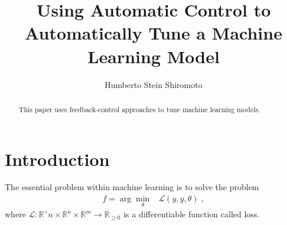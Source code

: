 \documentclass{tufte-handout}
\title{Using Automatic Control to Automatically Tune a Machine Learning Model}
\author[H. Stein Shiromoto]{Humberto Stein Shiromoto}
\begin{document}
\maketitle%

\begin{abstract}
\noindent
This paper uses feedback-control approaches to tune machine learning models.
\end{abstract}


\section{Introduction}

The essential problem within machine learning is to solve the problem
\begin{eqnarray}
  f=\arg\min_\theta&\mathcal{L}(y,\hat{y},\theta)\;,
\end{eqnarray}
where $\mathcal{L}:\mathbb{R}ˆn\times\mathbb{R}^n\times\mathbb{R}^m\to\mathbb{R}_{\geq0}$ is a differentiable function called loss.
\end{document}
